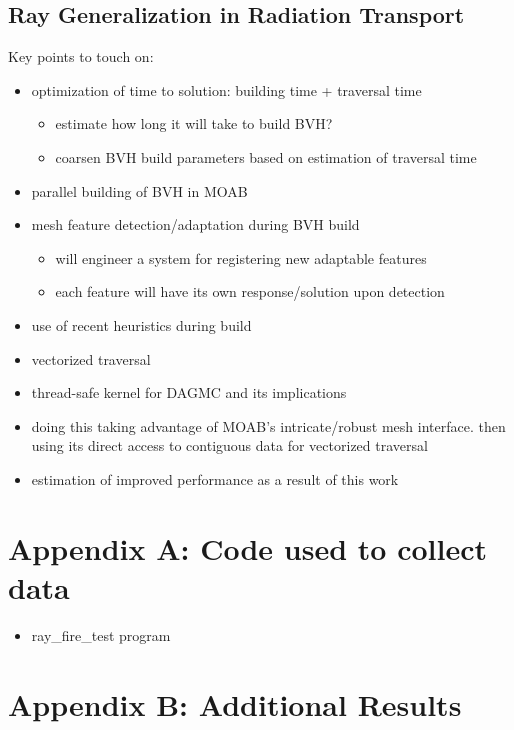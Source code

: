 \documentclass[12pt, a4paper]{article}
\begin{document}
\subsection{Ray Generalization in Radiation Transport}%

Key points to touch on:
\begin{itemize}
\item optimization of time to solution: building time + traversal time
  \begin{itemize}
  \item estimate how long it will take to build BVH?
  \item coarsen BVH build parameters based on estimation of traversal time
  \end{itemize}
\item parallel building of BVH in MOAB
\item mesh feature detection/adaptation during BVH build
  \begin{itemize}
  \item will engineer a system for registering new adaptable features
  \item each feature will have its own response/solution upon detection
  \end{itemize}
\item use of recent heuristics during build
\item vectorized traversal
\item thread-safe kernel for DAGMC and its implications
\item doing this taking advantage of MOAB's intricate/robust mesh interface. then using its direct access to contiguous data for vectorized traversal
\item estimation of improved performance as a result of this work
\end{itemize}






\section{Appendix A: Code used to collect data}%
\begin{itemize}
\item ray\_fire\_test program
\end{itemize}

\section{Appendix B: Additional Results}%
\end{document}
